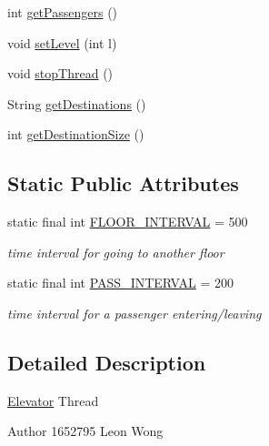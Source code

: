 \begin{DoxyCompactItemize}
\item 
int \hyperlink{classcn_1_1leonwong_1_1_elevator_simulator_1_1_model_1_1_elevator_acd5f3b902008c64175d9b5c035e8d77f}{get\+Passengers} ()
\item 
void \hyperlink{classcn_1_1leonwong_1_1_elevator_simulator_1_1_model_1_1_elevator_aadee7a0c9b8e13427d46a9f907dcee94}{set\+Level} (int l)
\item 
void \hyperlink{classcn_1_1leonwong_1_1_elevator_simulator_1_1_model_1_1_elevator_a838e6a91c1e6d1ed2786efc462c48151}{stop\+Thread} ()
\item 
String \hyperlink{classcn_1_1leonwong_1_1_elevator_simulator_1_1_model_1_1_elevator_aca1fa93441f3463aece03f01591efa61}{get\+Destinations} ()
\item 
int \hyperlink{classcn_1_1leonwong_1_1_elevator_simulator_1_1_model_1_1_elevator_a8e71679aa5ed47ac62be7d4193f81055}{get\+Destination\+Size} ()
\end{DoxyCompactItemize}
\subsection*{Static Public Attributes}
\begin{DoxyCompactItemize}
\item 
static final int \hyperlink{classcn_1_1leonwong_1_1_elevator_simulator_1_1_model_1_1_elevator_af9cc2a12533172485e7539f3690b2af9}{F\+L\+O\+O\+R\+\_\+\+I\+N\+T\+E\+R\+V\+AL} = 500
\begin{DoxyCompactList}\small\item\em time interval for going to another floor \end{DoxyCompactList}\item 
static final int \hyperlink{classcn_1_1leonwong_1_1_elevator_simulator_1_1_model_1_1_elevator_ac80145be36386f30ed5b40518706fdc6}{P\+A\+S\+S\+\_\+\+I\+N\+T\+E\+R\+V\+AL} = 200
\begin{DoxyCompactList}\small\item\em time interval for a passenger entering/leaving \end{DoxyCompactList}\end{DoxyCompactItemize}


\subsection{Detailed Description}
\hyperlink{classcn_1_1leonwong_1_1_elevator_simulator_1_1_model_1_1_elevator}{Elevator} Thread \begin{DoxyAuthor}{Author}
1652795 Leon Wong 
\end{DoxyAuthor}


